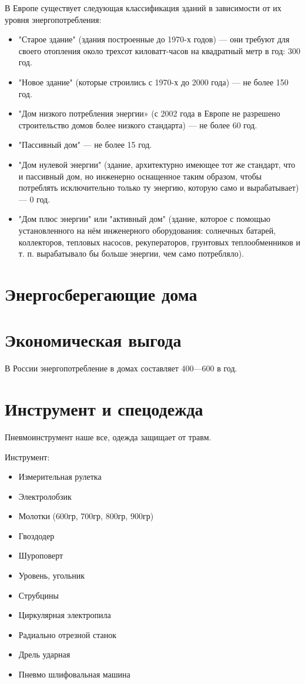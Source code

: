 \documentclass[10pt, twocolumn]{report}
\begin{document}
В Европе существует следующая классификация зданий в зависимости от их уровня энергопотребления:
\begin{itemize}
	\item "Старое здание" (здания построенные до 1970-х годов) — они требуют для своего отопления около трехсот киловатт-часов на квадратный метр в год: 300 \kwpm год.
	\item "Новое здание" (которые строились с 1970-х до 2000 года) — не более 150 \kwpm год.
	\item "Дом низкого потребления энергии» (с 2002 года в Европе не разрешено строительство домов более низкого стандарта) — не более 60 \kwpm год.
	\item "Пассивный дом" — не более 15 \kwpm год.
	\item "Дом нулевой энергии" (здание, архитектурно имеющее тот же стандарт, что и пассивный дом, но инженерно оснащенное таким образом, чтобы потреблять исключительно только ту энергию, которую само и вырабатывает) — 0 \kwpm год.
	\item "Дом плюс энергии" или "активный дом" (здание, которое с помощью установленного на нём инженерного оборудования: солнечных батарей, коллекторов, тепловых насосов, рекуператоров, грунтовых теплообменников и т. п. вырабатывало бы больше энергии, чем само потребляло).
	
\end{itemize}

\section{Энергосберегающие дома}


\section{Экономическая выгода}
В России энергопотребление в домах составляет 400—600 \kwpm в год.

\section{Инструмент и спецодежда}

Пневмоинструмент наше все, одежда защищает от травм.

Инструмент:

\begin{itemize}
	\item Измерительная рулетка
	\item Электролобзик
	\item Молотки (600гр, 700гр, 800гр, 900гр)
	\item Гвоздодер
	\item Шуроповерт
	\item Уровень, угольник
	\item Струбцины
	\item Циркулярная электропила
	\item Радиально отрезной станок
	\item Дрель ударная
	\item Пневмо шлифовальная машина
\end{itemize}
\end{document}
